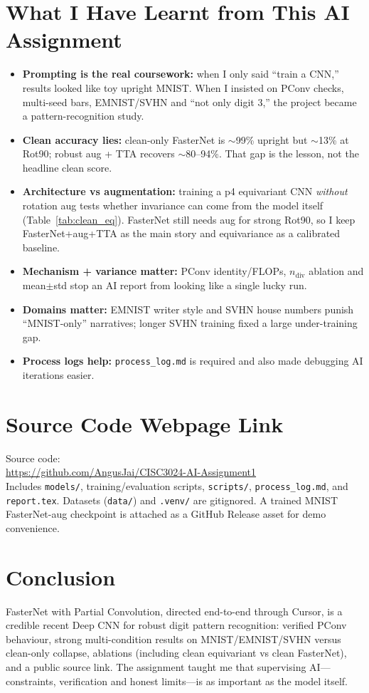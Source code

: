 \documentclass[11pt,a4paper]{article}
\begin{document}
\section{What I Have Learnt from This AI Assignment}
\begin{itemize}
  \item \textbf{Prompting is the real coursework:} when I only said ``train a CNN,'' results looked like toy upright MNIST. When I insisted on PConv checks, multi-seed bars, EMNIST/SVHN and ``not only digit 3,'' the project became a pattern-recognition study.
  \item \textbf{Clean accuracy lies:} clean-only FasterNet is $\sim$99\% upright but $\sim$13\% at Rot90; robust aug + TTA recovers $\sim$80--94\%. That gap is the lesson, not the headline clean score.
  \item \textbf{Architecture vs augmentation:} training a p4 equivariant CNN \emph{without} rotation aug tests whether invariance can come from the model itself (Table~\ref{tab:clean_eq}). FasterNet still needs aug for strong Rot90, so I keep FasterNet+aug+TTA as the main story and equivariance as a calibrated baseline.
  \item \textbf{Mechanism + variance matter:} PConv identity/FLOPs, $n_{\mathrm{div}}$ ablation and mean$\pm$std stop an AI report from looking like a single lucky run.
  \item \textbf{Domains matter:} EMNIST writer style and SVHN house numbers punish ``MNIST-only'' narratives; longer SVHN training fixed a large under-training gap.
  \item \textbf{Process logs help:} \texttt{process\_log.md} is required and also made debugging AI iterations easier.
\end{itemize}

\section{Source Code Webpage Link}
Source code:\\[0.3em]
\url{https://github.com/AngusJai/CISC3024-AI-Assignment1}\\[0.3em]
{\small Includes \texttt{models/}, training/evaluation scripts, \texttt{scripts/}, \texttt{process\_log.md}, and \texttt{report.tex}. Datasets (\texttt{data/}) and \texttt{.venv/} are gitignored. A trained MNIST FasterNet-aug checkpoint is attached as a GitHub Release asset for demo convenience.}

\section{Conclusion}
FasterNet with Partial Convolution, directed end-to-end through Cursor, is a credible recent Deep CNN for robust digit pattern recognition: verified PConv behaviour, strong multi-condition results on MNIST/EMNIST/SVHN versus clean-only collapse, ablations (including clean equivariant vs clean FasterNet), and a public source link. The assignment taught me that supervising AI---constraints, verification and honest limits---is as important as the model itself.
\end{document}
